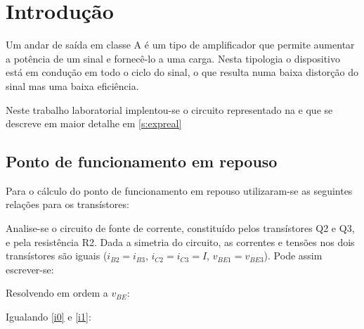 \documentclass[%
  reprint,
  nofootinbib,
  amsmath,amssymb,
  aps,
  10pt,
  a4paper
]{revtex4-1}
\begin{document}
\section{Introdução}
\label{s:intro}

Um andar de saída em classe A é um tipo de amplificador que permite aumentar a potência de um sinal e fornecê-lo a uma carga. Nesta tipologia o dispositivo está em condução em todo o ciclo do sinal, o que resulta numa baixa distorção do sinal mas uma baixa eficiência.


Neste trabalho laboratorial implentou-se o circuito representado na  e que se descreve em maior detalhe em \ref{s:expreal}

\subsection{Ponto de funcionamento em repouso}
Para o cálculo do ponto de funcionamento em repouso utilizaram-se as seguintes relações para os transístores:

Analise-se o circuito de fonte de corrente, constituído pelos transístores Q2 e Q3, e pela resistência R2. Dada a simetria do circuito, as correntes e tensões nos dois transístores são iguais ($i_{B2}=i_{B3}$, $i_{C2}=i_{C3}=I$, $v_{BE1}=v_{BE3}$). Pode assim escrever-se:

Resolvendo em ordem a $v_{BE}$:

Igualando \eqref{i0} e \eqref{i1}:
\end{document}
